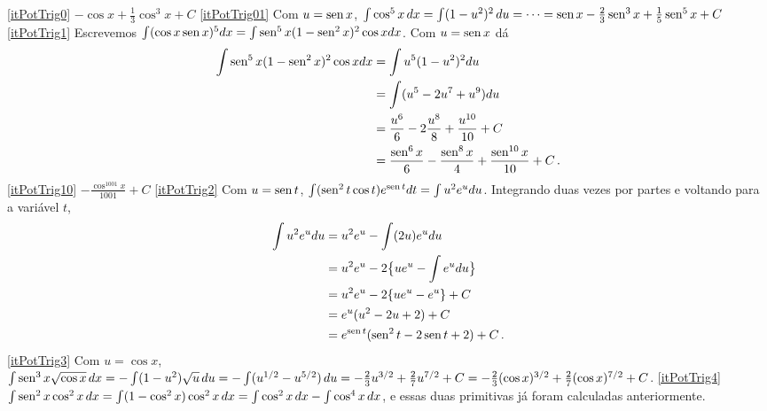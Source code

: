 \begin{Solution}{9.26}
\eqref{itPotTrig0} $-\cos x+\tfrac13\cos^3x+C$
\eqref{itPotTrig01} Com $u=\operatorname{sen} x$, $\int \cos^5x\,dx=\int
(1-u^2)^2\,du=\cdots=\operatorname{sen} x-\tfrac23\operatorname{sen}^3x+\tfrac15\operatorname{sen}^5x+C$
\eqref{itPotTrig1} Escrevemos
$\int (\cos x\operatorname{sen} x)^5dx=\int
\operatorname{sen}^5x(1-\operatorname{sen}^2x)^2\cos xdx$.
Com $u=\operatorname{sen} x$ dá
\begin{align*}
 \int \operatorname{sen}^5x(1-\operatorname{sen}^2x)^2\cos xdx&=
\int u^5(1-u^2)^2du\\
&=\int (u^5-2u^7+u^9)du\\
&=\frac{u^6}{6}-2\frac{u^8}{8}+\frac{u^{10}}{10}+C\\
&=\frac{\operatorname{sen}^6x}{6}-\frac{\operatorname{sen}^8x}{4}+\frac{\operatorname{sen}^{10}x}{10}+C\,.
\end{align*}
\eqref{itPotTrig10} $-\frac{\cos^{1001}x}{1001}+C$
\eqref{itPotTrig2}
Com $u=\operatorname{sen} t$,
$\int (\operatorname{sen}^2t\cos t) e^{\operatorname{sen} t}dt=\int u^2e^udu$.
Integrando duas vezes por partes e voltando para a variável $t$,
\begin{align*}
 \int u^2e^udu&=u^2e^u-\int (2u)e^udu\\
&=u^2e^u-2\big\{ue^u-\int e^udu\big\}\\
&=u^2e^u-2\{ue^u-e^u\}+C\\
&=e^u(u^2-2u+2)+C\\
&=e^{\operatorname{sen} t}(\operatorname{sen}^2 t-2\operatorname{sen} t+2)+C\,.
\end{align*}
\eqref{itPotTrig3} Com $u=\cos x$,
$\int \operatorname{sen}^3x \sqrt{\cos x}\,dx=-\int(1-u^2)\sqrt{u}\,du=-\int
(u^{1/2}-u^{5/2})\,du=-\tfrac23 u^{3/2}+\tfrac27 u^{7/2}+C=-\tfrac23
(\cos x)^{3/2}+\tfrac27 (\cos x)^{7/2}+C$.
\eqref{itPotTrig4} $\int
\operatorname{sen}^2x\cos^2x\,dx=\int(1-\cos^2x)\cos^2x\,dx=\int\cos^2x\,dx-\int\cos^4x\,dx$,
e essas duas primitivas já foram calculadas anteriormente.
\end{Solution}
